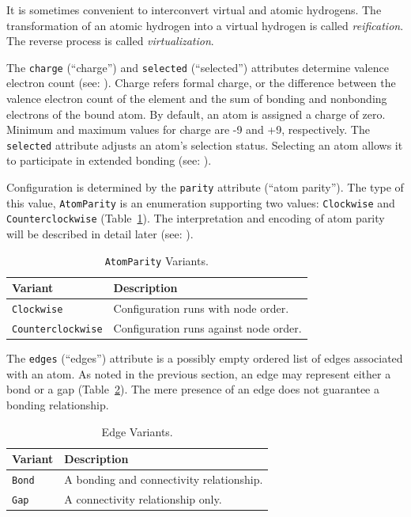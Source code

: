 \documentclass{article}
\def\ttt{\texttt}
\begin{document}
It is sometimes convenient to interconvert virtual and atomic hydrogens. The transformation of an atomic hydrogen into a virtual hydrogen is called \textit{reification}. The reverse process is called \textit{virtualization}.

The \ttt{charge} (\enquote{charge}) and \ttt{selected} (\enquote{selected}) attributes determine valence electron count (see: ). Charge refers formal charge, or the difference between the valence electron count of the element and the sum of bonding and nonbonding electrons of the bound atom. By default, an atom is assigned a charge of zero. Minimum and maximum values for charge are -9 and +9, respectively. The \ttt{selected} attribute adjusts an atom's selection status. Selecting an atom allows it to participate in extended bonding (see: ).

Configuration is determined by the \ttt{parity} attribute (\enquote{atom parity}). The type of this value, \ttt{AtomParity} is an enumeration supporting two values: \ttt{Clockwise} and \ttt{Counterclockwise} (Table~\ref{table:atom-parity-variants}). The interpretation and encoding of atom parity will be described in detail later (see: ).

\begin{table}
\caption{\ttt{AtomParity} Variants.}
\centering
\begin{tabular}{l l}
    \hline
    Variant & Description  \\
    \hline
    \ttt{Clockwise} & Configuration runs with node order. \\
    \ttt{Counterclockwise} & Configuration runs against node order. \\
    \hline
\end{tabular}
\label{table:atom-parity-variants}
\end{table}

The \ttt{edges} (\enquote{edges}) attribute is a possibly empty ordered list of edges associated with an atom. As noted in the previous section, an edge may represent either a bond or a gap (Table~\ref{table:edge-variants}). The mere presence of an edge does not guarantee a bonding relationship.

\begin{table}
\caption{Edge Variants.}
\centering
\begin{tabular}{l l}
    \hline
    Variant & Description  \\
    \hline
    \ttt{Bond} & A bonding and connectivity relationship. \\
    \ttt{Gap} & A connectivity relationship only. \\
    \hline
\end{tabular}
\label{table:edge-variants}
\end{table}
\end{document}
